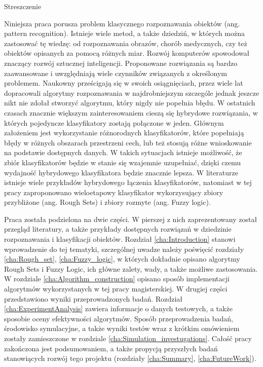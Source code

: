 \thispagestyle{empty}
\begin{center}
	Streszczenie
\end{center}
Niniejsza praca porusza problem klasycznego rozpoznawania obiektów (ang.
pattern recognition). Istnieje wiele metod, a także dziedziń, w których można
zastosować tę wiedzę: od rozpoznawania obrazów, chorób medycznych, czy też
obiektów opisanych za pomocą różnych miar. Rozwój komputerów spowodował 
znaczący rozwój sztucznej inteligencji. Proponowane rozwiązania są bardzo 
zaawansowane i uwzględniają wiele czynników związanych z
określonym problemem. Naukowny prześcigają się w swoich osiągnięciach, przez wiele lat 
dopracowali algorytmy rozpoznawania w najdrobniejszym szczególe jednak jeszcze
nikt nie zdołał stworzyć algorytmu, który nigdy nie popełnia błędu. W ostatnich
czasach znacznie większym zainteresowaniem cieszą się hybrydowe rozwiązania, w
których pojedyncze klasyfikatory zostają połączone w jeden. Głównym założeniem
jest wykorzystanie różnorodnych klasyfikatorów, które popełniają błędy w
różnych obszarach przestrzeni cech, lub też stosują różne wnioskowanie na
podstawie dostępnych danych. W takich sytuacjach istnieje możliwość, że zbiór
klasyfikatorów będzie w stanie się wzajemnie uzupełniać, dzięki czemu wydajność
hybrydowego klasyfikatora będzie znacznie lepsza. W literaturze istnieje wiele
przykładów hybrydowego łączenia klasyfikatorów, natomiast w tej pracy zaproponowano 
wieloetapowy klasyfikator wykorzysujący zbiory przybliżone (ang. Rough Sets) i zbiory 
rozmyte (ang. Fuzzy logic).
 
Praca została podzielona na dwie części. W pierszej z nich zaprezentowany
został przegląd literatury, a także przykłady dostępnych rozwiązań w dziedzinie
rozpoznawania i klasyfikacji obiektów. Rozdział \ref{cha:Introduction} stanowi wprowadzenie do
tej tematyki, szczególnej uwadze należy
poświęcić rozdziały \ref{cha:Rough_set}, \ref{cha:Fuzzy_logic}, w których
dokładnie opisano algorytmy Rough Sets i Fuzzy Logic, ich główne zalety, wady,
a także możliwe zastosowania. W rozdziale \ref{cha:Algorithm_construction}
opisano sposób implementacji algorytmów wykorzystanych w tej pracy
magisterskiej. W drugiej części przedstawiono wyniki przeprowadzonych badań.
Rozdział \ref{cha:ExperimentAnalysis} zawiera informacje o danych testowych, a
także sposobie oceny efektywności algorytmów. Sposób przeprowadzenia badań,
środowisko symulacyjne, a także wyniki testów wraz z krótkim omówieniem zostały 
zamieszczone w rozdziale \ref{cha:Simulation_investugations}. Całość pracy
zakończona jest podsumowaniem, a także propycją przyszłych badań stanowiących
rozwój tego projektu (rozdziały \ref{cha:Summary}, \ref{cha:FutureWork}).

